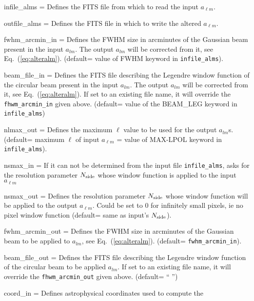 \begin{qualifiers}
  \begin{qulist}{} %
    \item[{infile\_alms = }] Defines the FITS file from which to read the input
	$a_{\ell m}$.
    \item[{outfile\_alms = }] Defines the FITS file in which to write the altered
	$a_{\ell m}$.
    \item[{fwhm\_arcmin\_in = }] Defines the FWHM size in arcminutes 
      of the Gaussian beam present in the input $a_{lm}$. The output $a_{lm}$ will be
      corrected from it, see Eq.~(\ref{eq:alteralm}). (default= value of FWHM keyword in {\tt infile\_alms}).
    \item[{beam\_file\_in = }] Defines the FITS file describing the
      Legendre window function of the circular beam present in the input $a_{lm}$. The output $a_{lm}$ will be
      corrected from it, see Eq.~(\ref{eq:alteralm}). If set to an existing file name, it will override the
    {\tt fhwm\_arcmin\_in} given above. (default= value of the BEAM\_LEG keyword in {\tt infile\_alms})
     \item[{nlmax\_out = }] Defines the maximum $\ell$ value 
       to be used for the output $a_{lm}$s. (default= maximum $\ell$ of input
       $a_{\ell m}$ = value of MAX-LPOL keyword in {\tt infile\_alms}).
     \item[{nsmax\_in = }] If it can not be determined from the input file {\tt infile\_alms}, asks
       for the \healpix resolution parameter ${N_{\rm side}}$ whose
       window function is applied to the input $a_{\ell m}$
     \item[{nsmax\_out = }] Defines the \healpix resolution parameter ${N_{\rm side}}$ whose
       window function will be applied to the output $a_{\ell m}$. Could be set
       to 0 for infinitely small pixels, ie no pixel window function (default= same as input's ${N_{\rm side}}$).
    \item[{fwhm\_arcmin\_out = }] Defines the FWHM size in arcminutes 
      of the Gaussian beam to be applied to $a_{lm}$, see
      Eq.~(\ref{eq:alteralm}). (default= {\tt fwhm\_arcmin\_in}).
    \item[{beam\_file\_out = }] Defines the FITS file describing the
      Legendre window function of the circular beam to be applied $a_{lm}$. If
      set to an existing file name, it will override the 
    {\tt fhwm\_arcmin\_out} given above. (default= `` '')
    \item[{coord\_in = }] Defines astrophysical coordinates used to compute the

\end{qulist}
\end{qualifiers}
